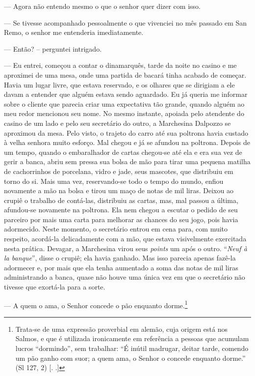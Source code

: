 --- Agora não entendo mesmo o que o senhor quer dizer com isso.

--- Se tivesse acompanhado pessoalmente o que vivenciei no mês passado em
San Remo, o senhor me entenderia imediatamente.

--- Então? -- perguntei intrigado.

--- Eu entrei, começou a contar o dinamarquês, tarde da noite no casino e
me aproximei de uma mesa, onde uma partida de bacará tinha acabado de
começar. Havia um lugar livre, que estava reservado, e os olhares que se
dirigiam a ele davam a entender que alguém estava sendo aguardado. Eu já
queria me informar sobre o cliente que parecia criar uma expectativa tão
grande, quando alguém ao meu redor mencionou seu nome. No mesmo
instante, apoiada pelo atendente do casino de um lado e pelo seu
secretário do outro, a Marchesina Dalpozzo se aproximou da mesa. Pelo
visto, o trajeto do carro até sua poltrona havia custado à velha senhora
muito esforço. Mal chegou e já se afundou na poltrona. Depois de um
tempo, quando o embaralhador de cartas chegou-se até ela e era sua vez
de gerir a banca, abriu sem pressa sua bolsa de mão para tirar uma
pequena matilha de cachorrinhos de porcelana, vidro e jade, seus
mascotes, que distribuiu em torno do si. Mais uma vez, reservando-se
todo o tempo do mundo, enfiou novamente a mão na bolsa e tirou um maço
de notas de mil liras. Deixou ao crupiê o trabalho de contá-las,
distribuiu as cartas, mas, mal passou a última, afundou-se novamente na
poltrona. Ela nem chegou a escutar o pedido de seu parceiro por mais uma
carta para melhorar as chances do seu jogo, pois havia adormecido. Neste
momento, o secretário entrou em cena para, com muito respeito, acordá-la
delicadamente com a mão, que estava visivelmente exercitada nesta
prática. Devagar, a Marchesina virou seus \emph{points} um após o outro.
``\emph{Neuf à la banque}'', disse o crupiê; ela havia ganhado. Mas isso parecia apenas fazê-la adormecer e, por mais que ela tenha aumentado a soma das notas de mil liras administrando a banca, quase não houve uma única vez em que o secretário não tivesse que exortá-la para a sorte.

--- A quem o ama, o Senhor concede o pão enquanto dorme.\footnote{Trata-se
  de uma expressão proverbial em alemão, cuja origem está nos Salmos, e
  que é utilizada ironicamente em referência a pessoas que acumulam
  lucros ``dormindo'', sem trabalhar: ``É inútil madrugar, deitar tarde,
  comendo um pão ganho com suor; a quem ama, o Senhor o concede enquanto
  dorme.'' (Sl 127, 2) [. .]}

